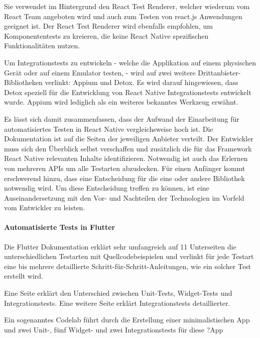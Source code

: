 Sie verwendet im Hintergrund den React Test Renderer, welcher wiederum vom React Team angeboten wird und auch zum Testen von react.js Anwendungen geeignet ist. Der React Test Renderer wird ebenfalls empfohlen, um Komponententests zu kreieren, die keine React Native spezifischen Funktionalitäten nutzen.

Um Integrationstests zu entwickeln - welche die Applikation auf einem physischen Gerät oder auf einem Emulator testen, - wird auf zwei weitere Drittanbieter-Bibliotheken verlinkt: Appium und Detox. Es wird darauf hingewiesen, dass Detox speziell für die Entwicklung von React Native Integrationstests entwickelt wurde. Appium wird lediglich als ein weiteres bekanntes Werkzeug erwähnt. 

Es lässt sich damit zusammenfassen, dass der Aufwand der Einarbeitung für automatisiertes Testen in React Native vergleichsweise hoch ist.
Die Dokumentation ist auf die Seiten der jeweiligen Anbieter verteilt.
Der Entwickler muss sich den Überblick selbst verschaffen und zusätzlich die für das Framework React Native relevanten Inhalte identifizieren.
Notwendig ist auch das Erlernen von mehreren APIs um alle Testarten abzudecken.
Für einen Anfänger kommt erschwerend hinzu, dass eine Entscheidung für die eine oder andere Bibliothek notwendig wird.
Um diese Entscheidung treffen zu können, ist eine Auseinandersetzung mit den Vor- und Nachteilen der Technologien im Vorfeld vom Entwickler zu leisten.

\paragraph{Automatisierte Tests in Flutter} Die Flutter Dokumentation erklärt sehr umfangreich auf 11 Unterseiten die unterschiedlichen Testarten mit Quellcodebeispielen und verlinkt für jede Testart eine bis mehrere detaillierte Schritt-für-Schritt-Anleitungen, wie ein solcher Test erstellt wird.

Eine Seite erklärt den Unterschied zwischen Unit-Tests, Widget-Tests und Integrationstests. Eine weitere Seite erklärt Integrationstests detaillierter.

Ein sogenanntes Codelab führt durch die Erstellung einer minimalistischen App und zwei Unit-, fünf Widget- und zwei Integrationstests für diese ?App

